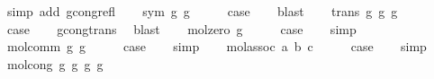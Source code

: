 \begin{isabellebody}
\ {\isacharparenleft}{\kern0pt}simp\ add{\isacharcolon}{\kern0pt}\ gcong{\isachardot}{\kern0pt}refl{\isacharparenright}{\kern0pt}\isanewline
{}\isamarkupfalse%
\isanewline
\ \ \isamarkupfalse%
\ {\isacharparenleft}{\kern0pt}sym\ g{}\ g{}{\isacharparenright}{\kern0pt}\isanewline
\ \ \isamarkupfalse%
\ \isamarkupfalse%
\ {\isacharquery}{\kern0pt}case\isanewline
\ \ \isamarkupfalse%
\ blast\isanewline
{}\isamarkupfalse%
\isanewline
\ \ \isamarkupfalse%
\ {\isacharparenleft}{\kern0pt}trans\ g{}\ g{}\ g{}{\isacharparenright}{\kern0pt}\isanewline
\ \ \isamarkupfalse%
\ \isamarkupfalse%
\ {\isacharquery}{\kern0pt}case\isanewline
\ \ \isamarkupfalse%
\ gcong{\isachardot}{\kern0pt}trans\ \isamarkupfalse%
\ blast\isanewline
{}\isamarkupfalse%
\isanewline
\ \ \isamarkupfalse%
\ {\isacharparenleft}{\kern0pt}mol{\isacharunderscore}{\kern0pt}zero\ g{\isacharparenright}{\kern0pt}\isanewline
\ \ \isamarkupfalse%
\ \isamarkupfalse%
\ {\isacharquery}{\kern0pt}case\isanewline
\ \ \isamarkupfalse%
\ simp\isanewline
{}\isamarkupfalse%
\isanewline
\ \ \isamarkupfalse%
\ {\isacharparenleft}{\kern0pt}mol{\isacharunderscore}{\kern0pt}comm\ g{}\ g{}{\isacharparenright}{\kern0pt}\isanewline
\ \ \isamarkupfalse%
\ \isamarkupfalse%
\ {\isacharquery}{\kern0pt}case\isanewline
\ \ \isamarkupfalse%
\ simp\isanewline
{}\isamarkupfalse%
\isanewline
\ \ \isamarkupfalse%
\ {\isacharparenleft}{\kern0pt}mol{\isacharunderscore}{\kern0pt}assoc\ a\ b\ c{\isacharparenright}{\kern0pt}\isanewline
\ \ \isamarkupfalse%
\ \isamarkupfalse%
\ {\isacharquery}{\kern0pt}case\isanewline
\ \ \isamarkupfalse%
\ simp\isanewline
{}\isamarkupfalse%
\isanewline
\ \ \isamarkupfalse%
\ {\isacharparenleft}{\kern0pt}mol{\isacharunderscore}{\kern0pt}cong\ g{}\ g{}{\isacharprime}{\kern0pt}\ g{}\ g{}{\isacharprime}{\kern0pt}{\isacharparenright}{\kern0pt}\isanewline
\ \ \isamarkupfalse%
\ \isamarkupfalse%

\end{isabellebody}
